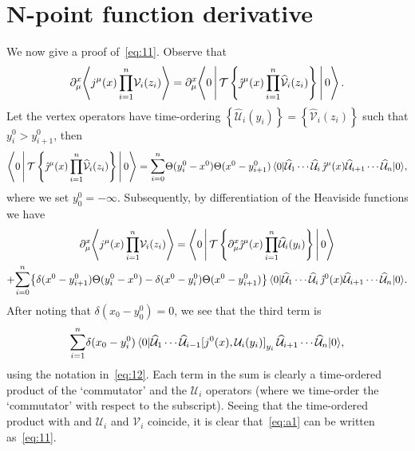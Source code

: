 \documentclass[11pt, a4paper]{article}
\begin{document}
\section{N-point function derivative}
We now give a proof of~\eqref{eq:11}. Observe that
\begin{equation}
  \partial^x_{\mu}\!\Braket{j^\mu(x)\prod^n_{i=1}{\!\mathcal{V}_i(z_i)}} =
  \partial^x_{\mu}\!\Braket{0|\mathcal{T}\left\{ \hat{\jmath}^\mu(x)
  \prod^n_{i=1}{\!\widehat{\mathcal{V}}_i(z_i)} \right\}|0}.
\end{equation}
Let the vertex operators have time-ordering
$\left\{ \widehat{\mathcal{U}}_i(y_i) \right\} =
\left\{{\widehat{\mathcal{V}}}_i(z_i) \right\}$
such that $y^0_i > y^0_{i+1}$, then
\begin{equation}\label{eq:a1}
\Braket{0|\mathcal{T}\left\{ \hat{\jmath}^\mu(x)
  \prod^n_{i=1}{\!\widehat{\mathcal{V}}_i(z_i)} \right\}|0} = 
  \mathlarger{\sum}^n_{i=0}{ \Theta(y^0_i - x^0)\Theta(x^0 - y^0_{i+1})
    \braket{0|{\widehat{\mathcal{U}}_1\cdots\widehat{\mathcal{U}}_i}\,\hat{\jmath}^\mu(x)
    {\widehat{\mathcal{U}}_{i+1}\cdots\widehat{\mathcal{U}}_n}|0}},
\end{equation}
where we set $y^0_0 = -\infty$. Subsequently, by differentiation
of the Heaviside functions we have
\begin{multline}
  \partial^x_{\mu}\!\Braket{j^\mu(x)\prod^n_{i=1}{\!\mathcal{V}_i(z_i)}} =
  \Braket{0|\mathcal{T}\left\{\partial^x_{\mu}\hat{\jmath}^\mu(x)
  \prod^n_{i=1}{\!\widehat{\mathcal{U}}_i(y_i)}\right\}|0} \\ 
  + \mathlarger{\sum}^n_{i=0}{\left\{\delta(x^0-y^0_{i+1})\Theta(y^0_i - x^0) -
    \delta(x^0-y^0_{i})\Theta(x^0 - y^0_{i+1})\right\}
      \braket{0|{\widehat{\mathcal{U}}_1\cdots\widehat{\mathcal{U}}_i}\,\hat{\jmath}^0(x)
    {\widehat{\mathcal{U}}_{i+1}\cdots\widehat{\mathcal{U}}_n}|0}
  }.
\end{multline}
After noting that $\delta(x_0 - y^0_0) = 0$, we see that the third term is
\begin{equation}
  \mathlarger{\sum}^n_{i=1}{\delta(x_0 - y^0_i)
    \braket{0|{\widehat{\mathcal{U}}_1\cdots\widehat{\mathcal{U}}_{i-1}}
    {[j^0(x),\mathcal{U}_i(y_i)]}_{y_i}\,
    {\widehat{\mathcal{U}}_{i+1}\cdots\widehat{\mathcal{U}}_n}|0} },
\end{equation}
using the notation in~\eqref{eq:12}. Each term in the sum is clearly a time-ordered
product of the `commutator' and the $\mathcal{U}_i$ operators (where
we time-order the `commutator' with respect to the subscript). Seeing 
that the time-ordered product with and $\mathcal{U}_i$ and $\mathcal{V}_i$ coincide,
it is clear that~\eqref{eq:a1} can be written as~\eqref{eq:11}.




\end{document}
